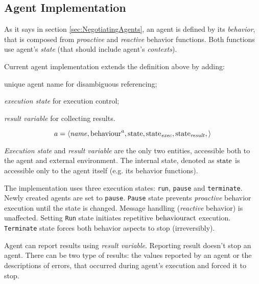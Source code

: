 \documentclass[../ThesisDoc]{subfiles}
\begin{document}
\providecommand{\rootdir}{..}


\subsection{Agent Implementation}


As it says in section \ref{sec:NegotiatingAgents}, an agent is defined by its
\emph{behavior}, that is composed from \emph{proactive} and \emph{reactive}
behavior functions. Both functions use agent's \emph{state} (that should include
agent's \emph{contexts}). 

Current agent implementation extends the definition above by adding:
\begin{enumerate*}[1)]
  \item unique agent name for disambiguous referencing;
  \item \emph{execution state} for execution control;
  \item \emph{result variable} for collecting results.
\end{enumerate*}

$$ a = \left< \mathit{name},
              \mathrm{behaviour}^a,
              \mathrm{state},
              \mathrm{state}_\mathit{exec},
              \mathrm{state}_\mathit{result},
       \right> $$

\noindent
\emph{Execution state} and \emph{result variable} are the only two entities,
accessible both to the agent and external environment. The internal state,
denoted as $\mathrm{state}$ is accessible only to the agent itself (e.g. its behavior functions).


The implementation uses three execution states: \texttt{run}, \texttt{pause}
and \texttt{terminate}. Newly created agents are set to \texttt{pause}.
\texttt{Pause} state prevents \emph{proactive} behavior execution until the state is changed.
Message handling (\emph{reactive} behavior) is unaffected.
Setting \texttt{Run} state initiates repetitive $\mathrm{behaviour}\mathrm{act}$ execution.
\texttt{Terminate} state forces both behavior aspects to stop (irreversibly).

Agent can report results using \emph{result variable}.
Reporting result doesn't stop an agent.
There can be two type of results: the values reported by an agent or
the descriptions of errors, that occurred during agent's execution
and forced it to stop.
\end{document}

